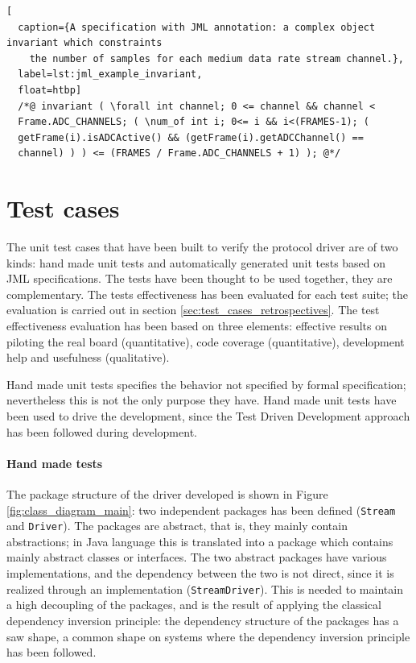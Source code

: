 \documentclass{article} \usepackage{times}
\newcommand{\lil}[1]{\texttt{\lstinline|#1|}}
\begin{document}
\fussy

\begin{lstlisting}[
  caption={A specification with JML annotation: a complex object invariant which constraints 
    the number of samples for each medium data rate stream channel.},
  label=lst:jml_example_invariant,
  float=htbp]
  /*@ invariant ( \forall int channel; 0 <= channel && channel <
  Frame.ADC_CHANNELS; ( \num_of int i; 0<= i && i<(FRAMES-1); (
  getFrame(i).isADCActive() && (getFrame(i).getADCChannel() ==
  channel) ) ) <= (FRAMES / Frame.ADC_CHANNELS + 1) ); @*/
\end{lstlisting}



\section{Test cases}
\label{sec:test_cases}

The unit test cases that have been built to verify the protocol driver
are of two kinds: hand made unit tests and automatically generated
unit tests based on JML specifications.  The tests have been thought
to be used together, they are complementary.  The tests effectiveness
has been evaluated for each test suite; the evaluation is carried out
in section \ref{sec:test_cases_retrospectives}.  The test
effectiveness evaluation has been based on three elements: effective
results on piloting the real board (quantitative), code coverage
(quantitative), development help and usefulness (qualitative).

Hand made unit tests specifies the behavior not specified by formal
specification; nevertheless this is not the only purpose they have.
Hand made unit tests have been used to drive the development, since
the Test Driven Development approach\cite{beck2003test} has been
followed during development.

\paragraph*{Hand made tests}

The package structure of the driver developed is shown in Figure
\ref{fig:class_diagram_main}: two independent packages has been
defined (\lil{Stream} and \lil{Driver}).  The packages are abstract,
that is, they mainly contain abstractions; in Java language this is
translated into a package which contains mainly abstract classes or
interfaces.  The two abstract packages have various implementations,
and the dependency between the two is not direct, since it is realized
through an implementation (\lil{StreamDriver}).  This is needed to
maintain a high decoupling of the packages, and is the result of
applying the classical dependency inversion
principle\cite{martin1996dependency}: the dependency structure of the
packages has a saw shape, a common shape on systems where the
dependency inversion principle has been followed.
\end{document}
